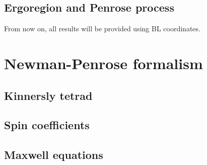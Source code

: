 

    

\subsection{Ergoregion and Penrose process}



From now on, all results will be provided using BL coordinates.

\section{Newman-Penrose formalism}

\subsection{Kinnersly tetrad}
\subsection{Spin coefficients}
\subsection{Maxwell equations}


\cleardoublepage